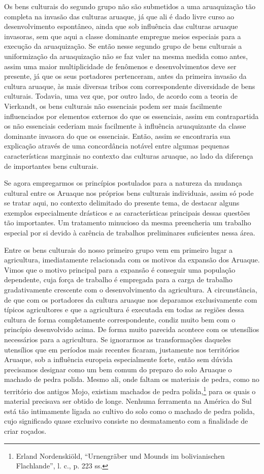 Os bens culturais do segundo grupo não são submetidos a uma aruaquização
tão completa na invasão das culturas aruaque, já que ali é dado livre
curso ao desenvolvimento espontâneo, ainda que sob influência das
culturas aruaque invasoras, sem que aqui a classe dominante empregue
meios especiais para a execução da aruaquização. Se então nesse segundo
grupo de bens culturais a uniformização da aruaquização não se faz
valer na mesma medida como antes, assim uma maior multiplicidade de
fenômenos e desenvolvimentos deve ser presente, já que os seus
portadores pertenceram, antes da primeira invasão da cultura aruaque, às
mais diversas tribos com correspondente diversidade de bens culturais.
Todavia, uma vez que, por outro lado, de acordo com a teoria de
Vierkandt, os bens culturais não essenciais podem ser mais facilmente
influenciados por elementos externos do que os essenciais, assim em
contrapartida os não essenciais cederiam mais facilmente à influência
aruaquizante da classe dominante invasora do que os essenciais. Então,
assim se encontraria sua explicação através de uma concordância notável
entre algumas pequenas características marginais no contexto das
culturas aruaque, ao lado da diferença de importantes bens culturais.

Se agora empregarmos os princípios postulados para a natureza da
mudança cultural entre os Aruaque nos próprios bens culturais
individuais, assim só pode se tratar aqui, no contexto delimitado do
presente tema, de destacar alguns exemplos especialmente drásticos e as
características principais dessas questões tão importantes. Um
tratamento minucioso da mesma preencheria um trabalho especial por si
devido à carência de trabalhos preliminares suficientes nessa área.

Entre os bens culturais do nosso primeiro grupo vem em primeiro lugar a
agricultura, imediatamente relacionada com os motivos da expansão dos
Aruaque. Vimos que o motivo principal para a expansão é conseguir uma
população dependente, cuja força de trabalho é empregada para a carga de
trabalho gradativamente crescente com o desenvolvimento da agricultura.
A circunstância, de que com os portadores da cultura aruaque nos
deparamos exclusivamente com típicos agricultores e que a agricultura é
executada em todas as regiões dessa cultura de forma completamente
correspondente, condiz muito bem com o princípio desenvolvido acima. De
forma muito parecida acontece com os utensílios necessários para a
agricultura. Se ignorarmos as transformações daqueles utensílios que em
períodos mais recentes ficaram, justamente nos territórios Aruaque, sob
a influência europeia especialmente forte, então sem dúvida precisamos
designar como um bem comum do preparo do solo Aruaque o machado de pedra
polida. Mesmo ali, onde faltam os materiais de pedra, como no território
dos antigos Mojo, existiam machados de pedra polida,\footnote{Erland
  Nordenskiöld, ``Urnengräber und Mounds im bolivianischen Flachlande'',
  l. c., p. 223 ss.} para os quais o material precisava ser obtido de
longe. Nenhuma ferramenta na América do Sul está tão intimamente ligada
ao cultivo do solo como o machado de pedra polida, cujo significado
quase exclusivo consiste no desmatamento com a finalidade de criar
roçados.

